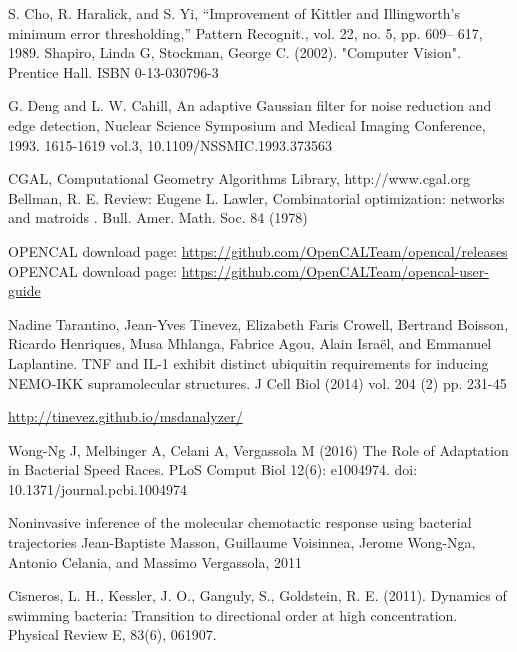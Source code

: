 \documentclass[conference]{IEEEtran}
\begin{document}
%
%
%
\begin{thebibliography}{1}

S. Cho, R. Haralick, and S. Yi, ``Improvement of Kittler and Illingworth’s minimum error thresholding,'' Pattern Recognit., vol. 22, no. 5, pp. 609– 617, 1989.
Shapiro, Linda G, Stockman, George C. (2002). "Computer Vision". Prentice Hall. ISBN 0-13-030796-3

G. Deng and L. W. Cahill, An adaptive Gaussian filter for noise reduction and edge detection, Nuclear Science Symposium and Medical Imaging Conference, 1993. 1615-1619 vol.3, 10.1109/NSSMIC.1993.373563

CGAL, Computational Geometry Algorithms Library, http://www.cgal.org
Bellman, R. E. Review: Eugene L. Lawler, Combinatorial optimization: networks and matroids . 
 Bull. Amer. Math. Soc. 84 (1978)



OPENCAL download page: \url{https://github.com/OpenCALTeam/opencal/releases}
OPENCAL download page: \url{https://github.com/OpenCALTeam/opencal-user-guide}

Nadine Tarantino, Jean-Yves Tinevez, Elizabeth Faris Crowell, Bertrand Boisson, Ricardo Henriques, Musa Mhlanga, Fabrice Agou, Alain Israël, and Emmanuel Laplantine. TNF and IL-1 exhibit distinct ubiquitin requirements for inducing NEMO-IKK supramolecular structures. J Cell Biol (2014) vol. 204 (2) pp. 231-45

\url{http://tinevez.github.io/msdanalyzer/}

Wong-Ng J, Melbinger A, Celani A, Vergassola M (2016) The Role of Adaptation in Bacterial Speed Races. PLoS Comput Biol 12(6): e1004974. doi: 10.1371/journal.pcbi.1004974

Noninvasive inference of the molecular chemotactic response using bacterial trajectories Jean-Baptiste Masson, Guillaume Voisinnea, Jerome Wong-Nga, Antonio Celania, and Massimo Vergassola, 2011

Cisneros, L. H., Kessler, J. O., Ganguly, S.,  Goldstein, R. E. (2011). Dynamics of swimming bacteria: Transition to directional order at high concentration. Physical Review E, 83(6), 061907.
\end{thebibliography}
\end{document}
